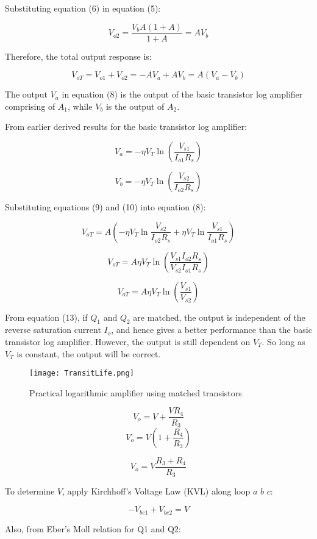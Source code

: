 \documentclass[a4paper,9pt,twoside,openany,twocolumn]{memoir}
\begin{document}
Substituting equation (6) in equation (5):

\[
V_{o2} = \frac{V_b A (1 + A)}{1 + A} = A V_b \tag{7}
\]

Therefore, the total output response is:

\[
V_{oT} = V_{o1} + V_{o2} = - A V_a + A V_b = A (V_a - V_b) \tag{8}
\]

The output \( V_a \) in equation (8) is the output of the basic transistor log amplifier comprising of \( A_1 \), while \( V_b \) is the output of \( A_2 \).

From earlier derived results for the basic transistor log amplifier:

\[
V_a = - \eta V_T \ln \left( \frac{V_{s1}}{I_{o1} R_s} \right) \tag{9}
\]

\[
V_b = - \eta V_T \ln \left( \frac{V_{s2}}{I_{o2} R_s} \right) \tag{10}
\]

Substituting equations (9) and (10) into equation (8):

\[
V_{oT} = A \left( - \eta V_T \ln \frac{V_{s2}}{I_{o2} R_s} + \eta V_T \ln \frac{V_{s1}}{I_{o1} R_s} \right) \tag{11}
\]

\[
V_{oT} = A \eta V_T \ln \left( \frac{V_{s1} I_{o2} R_s}{V_{s2} I_{o1} R_s} \right) \tag{12}
\]

\[
V_{oT} = A \eta V_T \ln \left( \frac{V_{s1}}{V_{s2}} \right) \tag{13}
\]

From equation (13), if \( Q_1 \) and \( Q_2 \) are matched, the output is independent of the reverse saturation current \( I_o \), and hence gives a better performance than the basic transistor log amplifier. However, the output is still dependent on \( V_T \). So long as \( V_T \) is constant, the output will be correct.
\begin{figure}[H]
    \centering
    \texttt{[image: TransitLife.png]}
    \caption{Practical logarithmic amplifier using matched transistors}
    \label{fig:question_image}
\end{figure}


\[
V_o = V + \frac{V R_4}{R_3} \tag{1}
\]
\[
V_o = V \left( 1 + \frac{R_4}{R_3} \right) \tag{2}
\]

\[
V_o = V \frac{R_3 + R_4}{R_3} \tag{3}
\]

To determine \( V \), apply Kirchhoff's Voltage Law (KVL) along loop \( a \) \( b \) \( c \):

\[
-V_{be1} + V_{be2} = V \tag{1a}
\]

Also, from Eber's Moll relation for Q1 and Q2:
\end{document}
